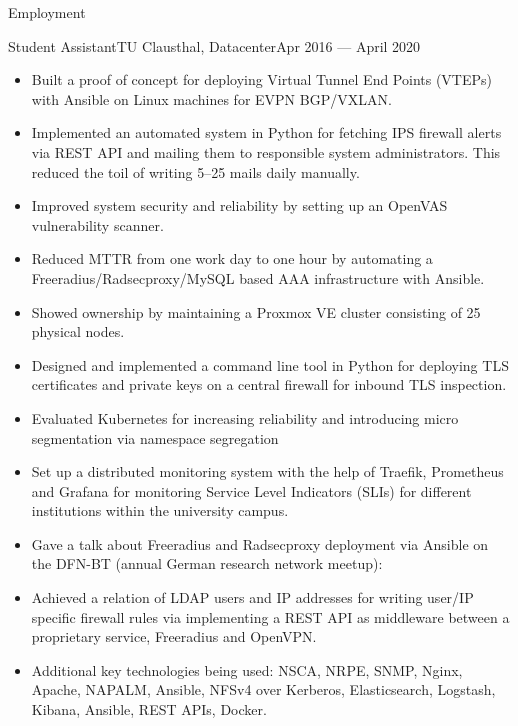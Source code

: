 \documentclass[]{mcdowellcv}
\begin{document}
\makeheader

\begin{cvsection}{Employment}
\begin{cvsubsection}{Student Assistant}{TU Clausthal, Datacenter}{Apr 2016 --- April 2020}

\begin{itemize}
\item Built a proof of concept for deploying Virtual Tunnel End Points (VTEPs) with Ansible on Linux machines for EVPN BGP/VXLAN.
\item Implemented an automated system in Python for fetching IPS firewall alerts via REST API and mailing them to responsible system administrators. This reduced the toil of writing 5--25 mails daily manually.
\item Improved system security and reliability by setting up an OpenVAS vulnerability scanner.
\item Reduced MTTR from one work day to one hour by automating a Freeradius/Radsecproxy/MySQL based AAA infrastructure with Ansible.
\item Showed ownership by maintaining a Proxmox VE cluster consisting of 25 physical nodes.
\item Designed and implemented a command line tool in Python for deploying TLS certificates and private keys on a central firewall for inbound TLS inspection.
\item Evaluated Kubernetes for increasing reliability and introducing micro segmentation via namespace segregation
\item Set up a distributed monitoring system with the help of Traefik, Prometheus and Grafana for monitoring Service Level Indicators (SLIs) for different institutions within the university campus.
\item Gave a talk about Freeradius and Radsecproxy deployment via Ansible on the DFN-BT (annual German research network meetup): 
\item Achieved a relation of LDAP users and IP addresses for writing user/IP specific firewall rules via implementing a REST API as middleware between a proprietary service, Freeradius and OpenVPN.
\item Additional key technologies being used: NSCA, NRPE, SNMP, Nginx, Apache, NAPALM, Ansible, NFSv4 over Kerberos, Elasticsearch, Logstash, Kibana, Ansible, REST APIs, Docker.
\end{itemize}
\end{cvsubsection}


\end{cvsection}
\end{document}
